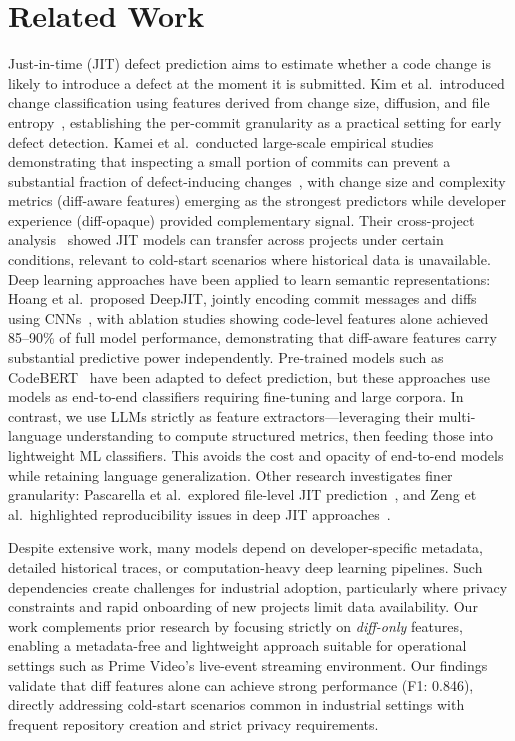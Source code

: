 \section{Related Work}


Just-in-time (JIT) defect prediction aims to estimate whether a code change is likely to introduce a defect at the moment it is submitted. Kim et al.\ introduced change classification using features derived from change size, diffusion, and file entropy~\cite{kim2008classifying}, establishing the per-commit granularity as a practical setting for early defect detection. Kamei et al.\ conducted large-scale empirical studies demonstrating that inspecting a small portion of commits can prevent a substantial fraction of defect-inducing changes~\cite{kamei2012large}, with change size and complexity metrics (diff-aware features) emerging as the strongest predictors while developer experience (diff-opaque) provided complementary signal. Their cross-project analysis~\cite{kamei2016studying} showed JIT models can transfer across projects under certain conditions, relevant to cold-start scenarios where historical data is unavailable. Deep learning approaches have been applied to learn semantic representations: Hoang et al.\ proposed DeepJIT, jointly encoding commit messages and diffs using CNNs~\cite{hoang2019deepjit}, with ablation studies showing code-level features alone achieved 85--90\% of full model performance, demonstrating that diff-aware features carry substantial predictive power independently. Pre-trained models such as CodeBERT~\cite{feng2020codebert} have been adapted to defect prediction, but these approaches use models as end-to-end classifiers requiring fine-tuning and large corpora. In contrast, we use LLMs strictly as feature extractors---leveraging their multi-language understanding to compute structured metrics, then feeding those into lightweight ML classifiers. This avoids the cost and opacity of end-to-end models while retaining language generalization. Other research investigates finer granularity: Pascarella et al.\ explored file-level JIT prediction~\cite{pascarella2019fine}, and Zeng et al.\ highlighted reproducibility issues in deep JIT approaches~\cite{zeng2021deep}.

Despite extensive work, many models depend on developer-specific metadata, detailed historical traces, or computation-heavy deep learning pipelines. Such dependencies create challenges for industrial adoption, particularly where privacy constraints and rapid onboarding of new projects limit data availability. Our work complements prior research by focusing strictly on \emph{diff-only} features, enabling a metadata-free and lightweight approach suitable for operational settings such as Prime Video's live-event streaming environment. Our findings validate that diff features alone can achieve strong performance (F1: 0.846), directly addressing cold-start scenarios common in industrial settings with frequent repository creation and strict privacy requirements.

